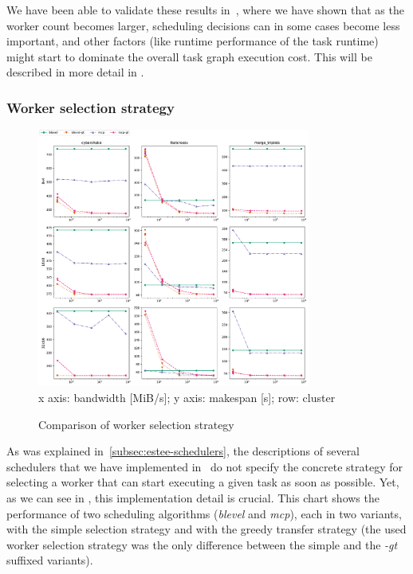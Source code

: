 We have been able to validate these results in~\cite{rsds}, where we have shown that as
the worker count becomes larger, scheduling decisions can in some cases become less important, and
other factors (like runtime performance of the task runtime) might start to dominate the overall
task graph execution cost. This will be described in more detail in .

\subsubsection*{Worker selection strategy}

\begin{figure}
	\caption{Comparison of worker selection strategy}
	\label{fig:estee-chart-gt-scheduler}
	\centering
	\includegraphics[width=0.8\textwidth]{imgs/estee/charts/gt-scheduler}\\
	{\small x axis: bandwidth [MiB/s]; y axis: makespan [s]; row: cluster}
\end{figure}

As was explained in~\ref{subsec:estee-schedulers}, the descriptions of several schedulers that we have
implemented in~\estee{} do not specify the concrete strategy for selecting a worker
that can start executing a given task as soon as possible. Yet, as we can see in
, this implementation detail is crucial. This chart shows the performance of
two scheduling algorithms (\emph{blevel} and \emph{mcp}), each in two
variants, with the simple selection strategy and with the greedy transfer strategy (the used worker
selection strategy was the only difference between the simple and the \emph{-gt}
suffixed variants).

